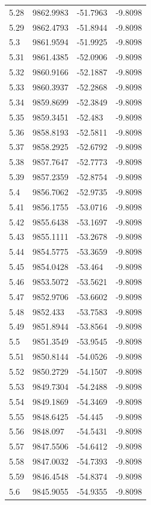 \begin{table}[H]
\begin{tabular}{llll}
5.28 & 9862.9983 & -51.7963 & -9.8098 \\
5.29 & 9862.4793 & -51.8944 & -9.8098 \\
5.3 & 9861.9594 & -51.9925 & -9.8098 \\
5.31 & 9861.4385 & -52.0906 & -9.8098 \\
5.32 & 9860.9166 & -52.1887 & -9.8098 \\
5.33 & 9860.3937 & -52.2868 & -9.8098 \\
5.34 & 9859.8699 & -52.3849 & -9.8098 \\
5.35 & 9859.3451 & -52.483 & -9.8098 \\
5.36 & 9858.8193 & -52.5811 & -9.8098 \\
5.37 & 9858.2925 & -52.6792 & -9.8098 \\
5.38 & 9857.7647 & -52.7773 & -9.8098 \\
5.39 & 9857.2359 & -52.8754 & -9.8098 \\
5.4 & 9856.7062 & -52.9735 & -9.8098 \\
5.41 & 9856.1755 & -53.0716 & -9.8098 \\
5.42 & 9855.6438 & -53.1697 & -9.8098 \\
5.43 & 9855.1111 & -53.2678 & -9.8098 \\
5.44 & 9854.5775 & -53.3659 & -9.8098 \\
5.45 & 9854.0428 & -53.464 & -9.8098 \\
5.46 & 9853.5072 & -53.5621 & -9.8098 \\
5.47 & 9852.9706 & -53.6602 & -9.8098 \\
5.48 & 9852.433 & -53.7583 & -9.8098 \\
5.49 & 9851.8944 & -53.8564 & -9.8098 \\
5.5 & 9851.3549 & -53.9545 & -9.8098 \\
5.51 & 9850.8144 & -54.0526 & -9.8098 \\
5.52 & 9850.2729 & -54.1507 & -9.8098 \\
5.53 & 9849.7304 & -54.2488 & -9.8098 \\
5.54 & 9849.1869 & -54.3469 & -9.8098 \\
5.55 & 9848.6425 & -54.445 & -9.8098 \\
5.56 & 9848.097 & -54.5431 & -9.8098 \\
5.57 & 9847.5506 & -54.6412 & -9.8098 \\
5.58 & 9847.0032 & -54.7393 & -9.8098 \\
5.59 & 9846.4548 & -54.8374 & -9.8098 \\
5.6 & 9845.9055 & -54.9355 & -9.8098 \\

\end{tabular}
\end{table}

